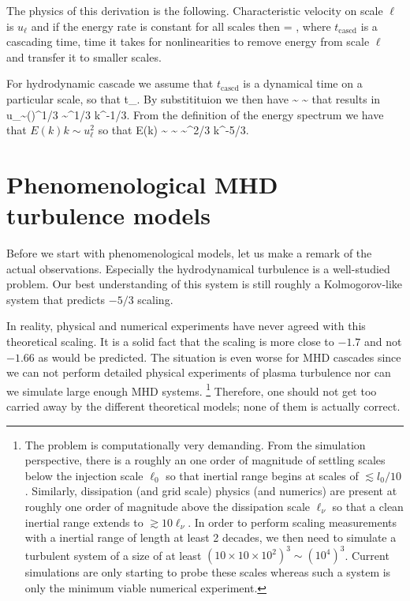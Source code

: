 \documentclass[usenatbib,twocolumn]{aastex63}
\newcommand{\tcascd}{t_\mathrm{cascd}} %
\begin{document}
The physics of this derivation is the following.
Characteristic velocity on scale $\ell$ is $u_\ell$ and if the energy rate is constant for all scales then
\be
\frac{u_\ell^2}{\tcascd} = \varepsilon,
\ee
where $\tcascd$ is a cascading time, time it takes for nonlinearities to remove energy from scale $\ell$ and transfer it to smaller scales.

For hydrodynamic cascade we assume that $\tcascd$ is a dynamical time on a particular scale, so that 
\be
\tcascd \approx {}.
\ee
By substitituion we then have
\be
\varepsilon \sim \frac{u_\ell^2}{\tcascd} \sim {}
\ee
that results in
\be
u_\ell \sim (\varepsilon \ell)^{1/3} \sim \varepsilon^{1/3} k^{-1/3}.
\ee
From the definition of the energy spectrum we have that $E(k) k \sim u_\ell^2$ so that
\be
E(k) \sim {} \sim {} \sim \varepsilon^{2/3} k^{-5/3}.
\ee


\section{Phenomenological MHD turbulence models}\label{sect:theory}

Before we start with phenomenological models, let us make a remark of the actual observations.
Especially the hydrodynamical turbulence is a well-studied problem.
Our best understanding of this system is still roughly a Kolmogorov-like system that predicts $-5/3$ scaling.

In reality, physical and numerical experiments have never agreed with this theoretical scaling.
It is a solid fact that the scaling is more close to $-1.7$  and not $-1.66$ as would be predicted.
The situation is even worse for MHD cascades since we can not perform detailed physical experiments of plasma turbulence nor can we simulate large enough MHD systems.%
\footnote{
    The problem is computationally very demanding.
From the simulation perspective, there is a roughly an one order of magnitude of settling scales below the injection scale $\ell_0$ so that inertial range begins at scales of $\lesssim l_0/10$.
Similarly, dissipation (and grid scale) physics (and numerics) are present at roughly one order of magnitude above the dissipation scale $\ell_\nu$ so that a clean inertial range extends to $\gtrsim 10 \ell_\nu$.
In order to perform scaling measurements with a inertial range of length at least 2 decades, we then need to simulate a turbulent system of a size of at least $(10\times10\times10^2)^3 \sim (10^4)^3$.
Current simulations are only starting to probe these scales whereas such a system is only the minimum viable numerical experiment.
}
Therefore, one should not get too carried away by the different theoretical models;
none of them is actually correct.
\end{document}
